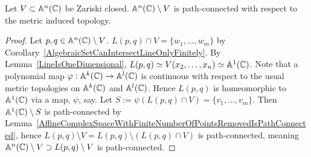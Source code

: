 \begin{proposition}
    Let $V\subset \mathbb{A}^n(\mathbb{C})$ be Zariski closed. $\mathbb{A}^n(\mathbb{C})\setminus V$ is path-connected with respect to the metric induced topology.
\end{proposition}
\begin{proof}
     Let $p,q\in \mathbb{A}^n(\mathbb{C})\setminus V$. $L(p,q)\cap V=\{w_1,\dots,w_m\}$ by Corollary~\ref{AlgebraicSetCanIntersectLineOnlyFinitely}. By Lemma~\ref{LineIsOneDimensional}, $L(p,q)\simeq V(x_2,\dots,x_n)\simeq \mathbb{A}^1(\mathbb{C})$. Note that a polynomial map $\varphi: \mathbb{A}^k(\mathbb{C})\rightarrow \mathbb{A}^l(\mathbb{C})$ is continuous with respect to the usual metric topologies on $\mathbb{A}^k(\mathbb{C})$ and $\mathbb{A}^l(\mathbb{C})$. Hence $L(p,q)$ is homeomorphic to $\mathbb{A}^1(\mathbb{C})$ via a map, $\psi$, say. Let $S:=\psi(L(p,q)\cap V)=\{v_1,\dots,v_m\}$. Then $\mathbb{A}^1(\mathbb{C})\setminus S$ is path-connected by Lemma~\ref{AffineComplexSpaceWithFiniteNumberOfPointsRemovedIsPathConnected}, hence $L(p,q)\setminus V=L(p,q)\setminus (L(p,q)\cap V)$ is path-connected, meaning $\mathbb{A}^n(\mathbb{C})\setminus V\supset L(p,q)\setminus V$ is path-connected.   
\end{proof}
